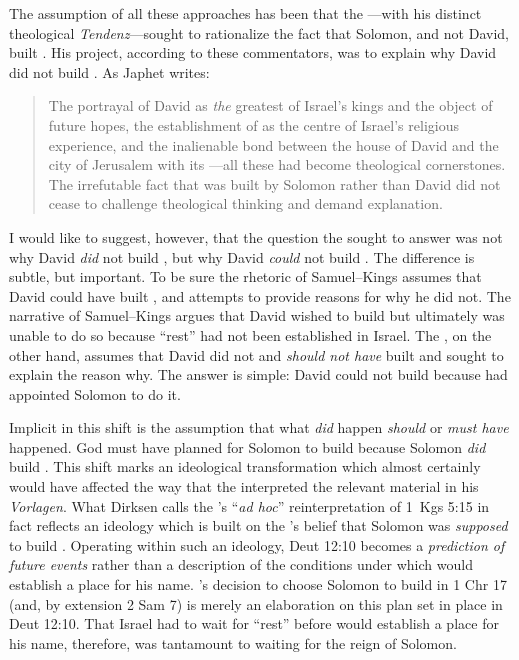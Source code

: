 The assumption of all these approaches has been that the \chronicler---with his distinct theological \emph{Tendenz}---sought to rationalize the fact that Solomon, and not David, built \thetemple. His project, according to these commentators, was to explain why David did not build \thetemple. As Japhet writes:
\begin{quote}
    The portrayal of David as \emph{the} greatest of Israel's kings and the object of future hopes, the establishment of \thetemple as the centre of Israel's religious experience, and the inalienable bond between the house of David and the city of Jerusalem with its \temple---all these had become theological cornerstones. The irrefutable fact that \thetemple was built by Solomon rather than David did not cease to challenge theological thinking and demand explanation.\autocite[396]{japhet1993}
\end{quote}
\noindent
I would like to suggest, however, that the question the \chronicler sought to answer was not why David \emph{did} not build \thetemple, but why David \emph{could} not build \thetemple. The difference is subtle, but important. To be sure the rhetoric of Samuel--Kings assumes that David could have built \thetemple, and attempts to provide reasons for why he did not. The narrative of Samuel--Kings argues that David wished to build \thetemple but ultimately  was unable to do so because ``rest'' had not been established in Israel. The \chronicler, on the other hand, assumes that David did not and \emph{should not have} built \thetemple and sought to explain the reason why. The answer is simple: David could not build \thetemple because \yahweh had appointed Solomon to do it. 

Implicit in this shift is the assumption that what \emph{did} happen
\emph{should} or \emph{must have} happened. God must have planned for Solomon to build \thetemple because Solomon \emph{did} build \thetemple. This shift marks an ideological transformation which almost certainly would have affected the way that the \chronicler interpreted the relevant material in his \emph{Vorlagen}. What Dirksen calls the \chronicler's ``\emph{ad hoc}'' reinterpretation of 1~Kgs 5:15 in fact reflects an ideology which is built on the \chronicler's belief that Solomon was \emph{supposed} to build \thetemple. Operating within such an ideology, Deut 12:10 becomes a \emph{prediction of future events} rather than a description of the conditions under which \yahweh would establish a place for his name. \yahweh's decision to choose Solomon to build \thetemple in 1 Chr 17 (and, by extension 2 Sam 7) is merely an elaboration on this plan set in place in Deut 12:10. That Israel had to wait for ``rest'' before \yahweh would establish a place for his name, therefore, was tantamount to waiting for the reign of Solomon. 

